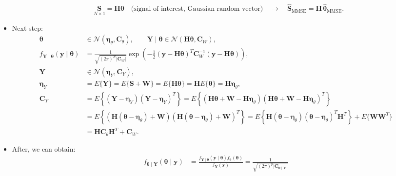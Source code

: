 \begin{itemize}
\begin{align*}
&\underset{N\times 1}{\mathbf{S}}
= \mathbf{H}\boldsymbol{\theta}
\quad\text{(signal of interest, Gaussian random vector)}\quad \rightarrow\quad\hat{\mathbf{S}}_{\text{MMSE}}
= \mathbf{H}\,\hat{\boldsymbol{\theta}}_{\text{MMSE}}.
\end{align*}
\item Next step:
\begin{align*}
\boldsymbol{\theta} &\in \mathcal{N}(\boldsymbol{\eta}_\theta,\mathbf{C}_\theta),
\qquad
\mathbf{Y}\mid\boldsymbol{\theta} \in \mathcal{N}(\mathbf{H}\boldsymbol{\theta},\mathbf{C}_W), \\[6pt]
f_{\mathbf{Y}\mid\boldsymbol{\theta}}(\mathbf{y}\mid\boldsymbol{\theta})
&= \frac{1}{\sqrt{(2\pi)^N\lvert\mathbf{C}_W\rvert}}
   \exp\!\left(
     -\frac{1}{2}(\mathbf{y}-\mathbf{H}\boldsymbol{\theta})^{T}
              \mathbf{C}_W^{-1}
              (\mathbf{y}-\mathbf{H}\boldsymbol{\theta})
   \right), \\[10pt]
\mathbf{Y} &\in \mathcal{N}(\boldsymbol{\eta}_Y,\mathbf{C}_Y), \\[4pt]
\boldsymbol{\eta}_Y
&= E\{\mathbf{Y}\}
 = E\{\mathbf{S}+\mathbf{W}\}
 = E\{\mathbf{H}\boldsymbol{\theta}\}
 = \mathbf{H}E\{\boldsymbol{\theta}\}
 = \mathbf{H}\boldsymbol{\eta}_\theta, \\[8pt]
\mathbf{C}_Y
&= E\!\left\{(\mathbf{Y}-\boldsymbol{\eta}_Y)
            (\mathbf{Y}-\boldsymbol{\eta}_Y)^{T}\right\} = E\!\left\{(\mathbf{H}\boldsymbol{\theta}+\mathbf{W}-\mathbf{H}\boldsymbol{\eta}_\theta)
            (\mathbf{H}\boldsymbol{\theta}+\mathbf{W}-\mathbf{H}\boldsymbol{\eta}_\theta)^{T}\right\} \\[2pt]
&= E\!\left\{(\mathbf{H}(\boldsymbol{\theta}-\boldsymbol{\eta}_\theta)+\mathbf{W})
            (\mathbf{H}(\boldsymbol{\theta}-\boldsymbol{\eta}_\theta)+\mathbf{W})^{T}\right\} = E\!\left\{\mathbf{H}(\boldsymbol{\theta}-\boldsymbol{\eta}_\theta)
              (\boldsymbol{\theta}-\boldsymbol{\eta}_\theta)^{T}\mathbf{H}^{T}\right\}
   + E\{\mathbf{W}\mathbf{W}^{T}\} \\[2pt]
&= \mathbf{H}\mathbf{C}_\theta\mathbf{H}^{T} + \mathbf{C}_W.
\end{align*}
\item After, we can obtain:
\begin{align*}
f_{\boldsymbol{\theta}\mid\mathbf{Y}}(\boldsymbol{\theta}\mid\mathbf{y})
&= \frac{f_{\mathbf{Y}\mid\boldsymbol{\theta}}(\mathbf{y}\mid\boldsymbol{\theta})
        f_{\boldsymbol{\theta}}(\boldsymbol{\theta})}
       {f_{\mathbf{Y}}(\mathbf{y})}
 = \frac{1}{\sqrt{(2\pi)^{p}\lvert\mathbf{C}_{\boldsymbol{\theta}\mid\mathbf{Y}}\rvert}}

\end{align*}
\end{itemize}
